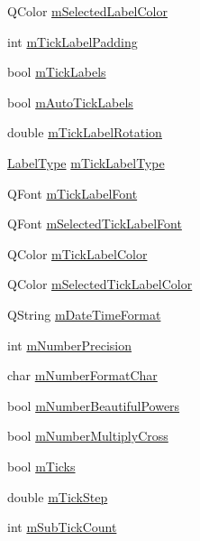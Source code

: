 \begin{DoxyCompactItemize}
\item 
Q\-Color \hyperlink{class_q_c_p_axis_a94f57de3ba024471ca206d83cf2258dd}{m\-Selected\-Label\-Color}
\item 
int \hyperlink{class_q_c_p_axis_ab3f2f5d923c83d952922149d0d1e2eb1}{m\-Tick\-Label\-Padding}
\item 
bool \hyperlink{class_q_c_p_axis_a3e4315be072026644e69009557a2fa11}{m\-Tick\-Labels}
\item 
bool \hyperlink{class_q_c_p_axis_a721e496b342f272078c5ff84564e472f}{m\-Auto\-Tick\-Labels}
\item 
double \hyperlink{class_q_c_p_axis_a47660c8694884cdb87495bf8b4c8a3b9}{m\-Tick\-Label\-Rotation}
\item 
\hyperlink{class_q_c_p_axis_a4a7da0166f755f5abac23b765d184cad}{Label\-Type} \hyperlink{class_q_c_p_axis_a6e056c1cb1aab0eddebfebbcb78c8f90}{m\-Tick\-Label\-Type}
\item 
Q\-Font \hyperlink{class_q_c_p_axis_add79d1e39c4ed65869a1e9cc79043f3f}{m\-Tick\-Label\-Font}
\item 
Q\-Font \hyperlink{class_q_c_p_axis_a4f2e4919da9615dac612662c249b1119}{m\-Selected\-Tick\-Label\-Font}
\item 
Q\-Color \hyperlink{class_q_c_p_axis_a6384a749b3b56a97df081d8082321ab4}{m\-Tick\-Label\-Color}
\item 
Q\-Color \hyperlink{class_q_c_p_axis_a3bcad40902f45dc4c991a2c3e4d31d70}{m\-Selected\-Tick\-Label\-Color}
\item 
Q\-String \hyperlink{class_q_c_p_axis_a0b7ad83550d71daab4cfee2918e168e0}{m\-Date\-Time\-Format}
\item 
int \hyperlink{class_q_c_p_axis_acd76e8c783384d99ccc4a13797eec188}{m\-Number\-Precision}
\item 
char \hyperlink{class_q_c_p_axis_a600d56365316ea783927f7d595f1ed54}{m\-Number\-Format\-Char}
\item 
bool \hyperlink{class_q_c_p_axis_af03809bee3f3e35fcc38d25b6dd5003b}{m\-Number\-Beautiful\-Powers}
\item 
bool \hyperlink{class_q_c_p_axis_aebf0367d8645d2e05b93a0952b7e805b}{m\-Number\-Multiply\-Cross}
\item 
bool \hyperlink{class_q_c_p_axis_ab111e74bba22e06848897c932fc549fe}{m\-Ticks}
\item 
double \hyperlink{class_q_c_p_axis_a4fe96830fc5a2711e20fe5edccfe2ed3}{m\-Tick\-Step}
\item 
int \hyperlink{class_q_c_p_axis_ad70198e6ae2801fc409bc3caec707da9}{m\-Sub\-Tick\-Count}
\item 

\end{DoxyCompactItemize}
